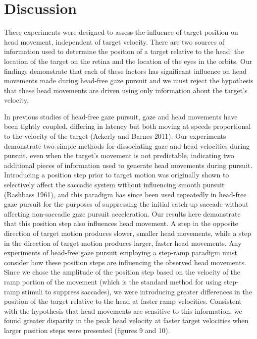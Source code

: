 \documentclass[12pt]{article}
\begin{document}
\section{Discussion}
These experiments were designed to assess the influence of target position on head movement, independent of target velocity. There are two sources of information used to determine the position of a target relative to the head: the location of the target on the retina and the location of the eyes in the orbits. Our findings demonstrate that each of these factors has significant influence on head movements made during head-free gaze pursuit and we must reject the hypothesis that these head movements are driven using only information about the target’s velocity. 

In previous studies of head-free gaze pursuit, gaze and head movements have been tightly coupled, differing in latency but both moving at speeds proportional to the velocity of the target (Ackerly and Barnes 2011). Our experiments demonstrate two simple methods for dissociating gaze and head velocities during pursuit, even when the target’s movement is not predictable, indicating two additional pieces of information used to generate head movements during pursuit.  Introducing a position step prior to target motion was originally shown to selectively affect the saccadic system without influencing smooth pursuit (Rashbass 1961), and this paradigm has since been used repeatedly in head-free gaze pursuit for the purposes of suppressing the initial catch-up saccade without affecting non-saccadic gaze pursuit acceleration. Our results here demonstrate that this position step also influences head movement. A step in the opposite direction of target motion produces slower, smaller head movements, while a step in the direction of target motion produces larger, faster head movements. Any experiments of head-free gaze pursuit employing a step-ramp paradigm must consider how these position steps are influencing the observed head movements. Since we chose the amplitude of the position step based on the velocity of the ramp portion of the movement (which is the standard method for using step-ramp stimuli to suppress saccades), we were introducing greater differences in the position of the target relative to the head at faster ramp velocities. Consistent with the hypothesis that head movements are sensitive to this information, we found greater disparity in the peak head velocity at faster target velocities when larger position steps were presented (figures 9 and 10).
\end{document}
